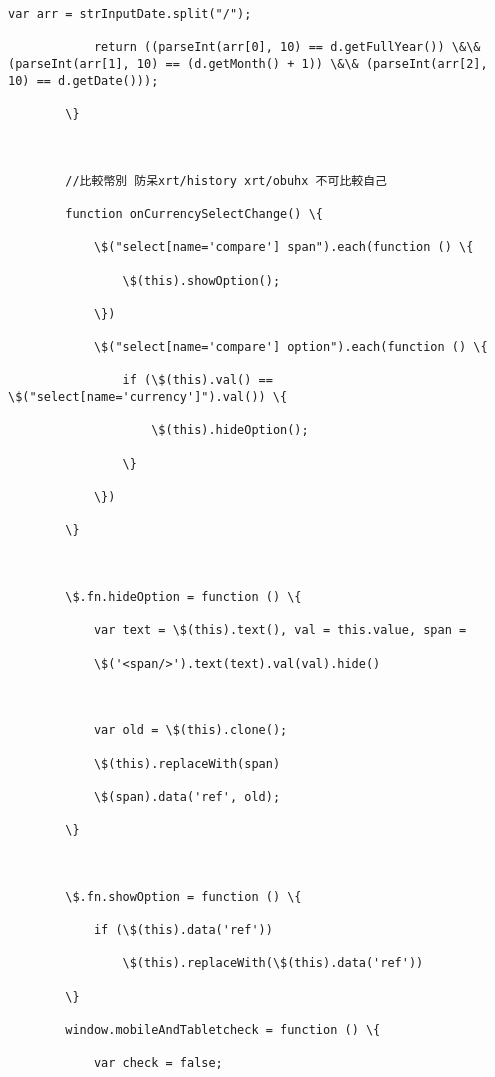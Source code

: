 \documentclass[11pt]{article}
\begin{document}
\begin{Verbatim}[commandchars=\\\{\}]
            var arr = strInputDate.split("/");

            return ((parseInt(arr[0], 10) == d.getFullYear()) \&\& (parseInt(arr[1], 10) == (d.getMonth() + 1)) \&\& (parseInt(arr[2], 10) == d.getDate()));

        \}



        //比較幣別 防呆xrt/history xrt/obuhx 不可比較自己

        function onCurrencySelectChange() \{

            \$("select[name='compare'] span").each(function () \{

                \$(this).showOption();

            \})

            \$("select[name='compare'] option").each(function () \{

                if (\$(this).val() == \$("select[name='currency']").val()) \{

                    \$(this).hideOption();

                \}

            \})

        \}



        \$.fn.hideOption = function () \{

            var text = \$(this).text(), val = this.value, span =

            \$('<span/>').text(text).val(val).hide()



            var old = \$(this).clone();

            \$(this).replaceWith(span)

            \$(span).data('ref', old);

        \}



        \$.fn.showOption = function () \{

            if (\$(this).data('ref'))

                \$(this).replaceWith(\$(this).data('ref'))

        \}

        window.mobileAndTabletcheck = function () \{

            var check = false;


\end{Verbatim}
\end{document}
